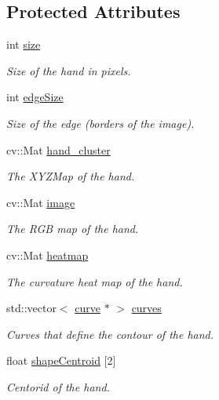 \subsection*{Protected Attributes}
\begin{DoxyCompactItemize}
\item 
int \hyperlink{class_hand_a11484b7843b03c2786972fec56eb2734}{size}
\begin{DoxyCompactList}\small\item\em Size of the hand in pixels. \end{DoxyCompactList}\item 
int \hyperlink{class_hand_a287a96efb8ba12064d5af85be07d64d9}{edge\+Size}
\begin{DoxyCompactList}\small\item\em Size of the edge (borders of the image). \end{DoxyCompactList}\item 
cv\+::\+Mat \hyperlink{class_hand_acbe984385f832d6b1d595dc280d59206}{hand\+\_\+cluster}
\begin{DoxyCompactList}\small\item\em The X\+Y\+Z\+Map of the hand. \end{DoxyCompactList}\item 
cv\+::\+Mat \hyperlink{class_hand_abfe6cc57de5f985ac7024c5f90d7f5da}{image}
\begin{DoxyCompactList}\small\item\em The R\+GB map of the hand. \end{DoxyCompactList}\item 
cv\+::\+Mat \hyperlink{class_hand_ac449abf8573f0e3b313dc23c4be8f325}{heatmap}
\begin{DoxyCompactList}\small\item\em The curvature heat map of the hand. \end{DoxyCompactList}\item 
std\+::vector$<$ \hyperlink{structcurve}{curve} $\ast$ $>$ \hyperlink{class_hand_a1a90a57256c5d724a12db86cb55c57c2}{curves}
\begin{DoxyCompactList}\small\item\em Curves that define the contour of the hand. \end{DoxyCompactList}\item 
float \hyperlink{class_hand_a89099eeaa8a0286f6baae95d3b0a9f20}{shape\+Centroid} \mbox{[}2\mbox{]}
\begin{DoxyCompactList}\small\item\em Centorid of the hand. \end{DoxyCompactList}\item 

\end{DoxyCompactItemize}

